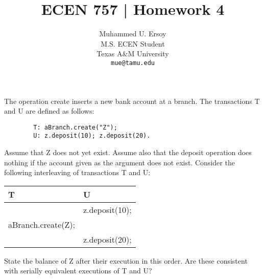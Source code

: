 \documentclass{article}
\title{ECEN 757 | Homework 4}
\author{%
  Muhammed U. Ersoy\\
  M.S. ECEN Student\\
  Texas A\&M University\\
  \texttt{mue@tamu.edu} \\
 }
\begin{document}
\maketitle

\begin{tcolorbox}[colback=blue!5!white,colframe=blue!75!black,title=Problem 16.4]
    The operation create inserts a new bank account at a branch. The transactions T and U
        are defined as follows:
    \begin{verbatim}
        T: aBranch.create("Z");
        U: z.deposit(10); z.deposit(20).
    \end{verbatim}
    Assume that Z does not yet exist. Assume also that the deposit operation does nothing if
    the account given as the argument does not exist. Consider the following interleaving of
    transactions T and U:

    \begin{table}[H]
    \centering
    \begin{tabular}{ll}
    T                                        & U                                   \\ \hline
    \multicolumn{1}{c}{}                   & \multicolumn{1}{c}{z.deposit(10);} \\
    \multicolumn{1}{c}{aBranch.create(Z);} & \multicolumn{1}{c}{}               \\
                                             & z.deposit(20);                      \\ \hline
    \end{tabular}
    \end{table}
    State the balance of Z after their execution in this order. Are these consistent with
    serially equivalent executions of T and U?
\end{tcolorbox}
\end{document}
